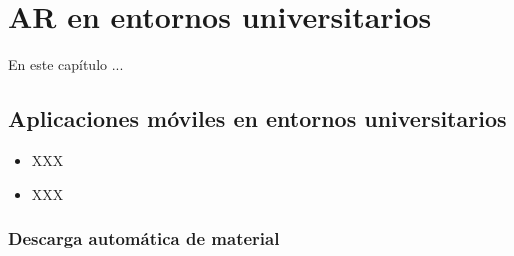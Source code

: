 %
%
%
%

\chapter{AR en entornos universitarios } \label{chap:AREntornosUniversitarios}  


En este capítulo ...

 
\section{Aplicaciones móviles en entornos universitarios}


\begin{itemize}
\item XXX
\item XXX
\end{itemize}



\subsection{Descarga automática de material} \label{sec:descargaautomatica}




